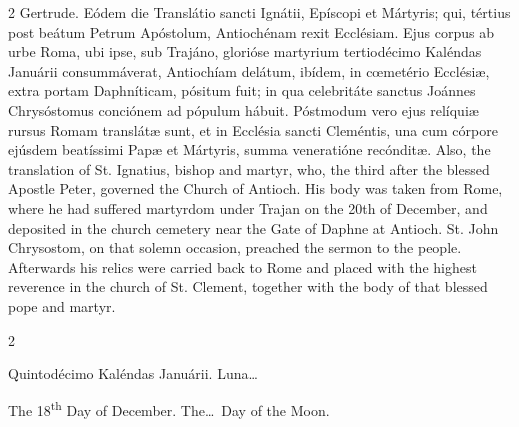 \begin{paracol}{2}
 Gertrude.
\switchcolumn*
{}
Eódem die Translátio sancti Ignátii, Epíscopi et Mártyris; qui, tértius post 
 beátum Petrum Apóstolum, Antiochénam rexit Ecclésiam. Ejus corpus ab 
 urbe Roma, ubi ipse, sub Trajáno, glorióse martyrium tertiodécimo Kaléndas 
 Januárii consummáverat, Antiochíam delátum, ibídem, in cœmetério 
 Ecclésiæ, extra portam Daphníticam, pósitum fuit; in qua celebritáte sanctus 
 Joánnes Chrysóstomus conciónem ad pópulum hábuit. Póstmodum vero ejus 
 relíquiæ rursus Romam translátæ sunt, et in Ecclésia sancti Cleméntis, una 
 cum córpore ejúsdem beatíssimi Papæ et Mártyris, summa veneratióne recónditæ.
\switchcolumn
{}
Also, the translation of St. Ignatius, bishop and martyr, who, the third 
 after the blessed Apostle Peter, governed the Church of Antioch. His 
 body was taken from Rome, where he had suffered martyrdom under Trajan on 
 the 20th of December, and deposited in the church cemetery near the Gate of 
 Daphne at Antioch. St. John Chrysostom, on that solemn occasion, 
 preached the sermon to the people. Afterwards his relics were carried 
 back to Rome and placed with the highest reverence in the church of St. 
 Clement, together with the body of that blessed pope and martyr.
\switchcolumn*
{}
\end{paracol}


\begin{paracol}{2}
\begin{center}{\color{gregoriocolor} Quintodécimo Kaléndas Januárii. 
 Luna\dots\ }\end{center}
\switchcolumn
{}
\begin{center}{\color{gregoriocolor} The 
 18\textsuperscript{th} Day of 
 December. The\dots\ Day of the Moon.}\end{center}
\end{paracol}

